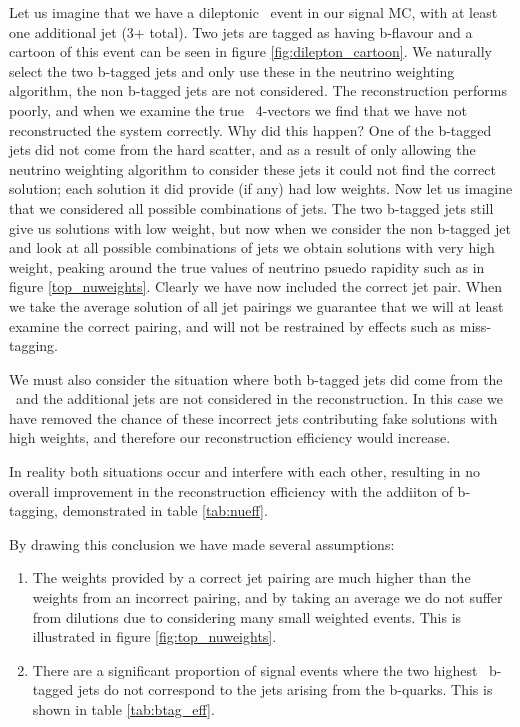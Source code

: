 Let us imagine that we have a dileptonic \ttbar\ event in our signal MC, with at least one additional jet (3+ total). Two jets are tagged as having b-flavour and a cartoon of this event can be seen in figure \ref{fig:dilepton_cartoon}. We naturally select the two b-tagged jets and only use these in the neutrino weighting algorithm, the non b-tagged jets are not considered. The reconstruction performs poorly, and when we examine the true \ttbar\ 4-vectors we find that we have not reconstructed the system correctly. Why did this happen? One of the b-tagged jets did not come from the hard scatter, and as a result of only allowing the neutrino weighting algorithm to consider these jets it could not find the correct solution; each solution it did provide (if any) had low weights. Now let us imagine that we considered all possible combinations of jets. The two b-tagged jets still give us solutions with low weight, but now when we consider the non b-tagged jet and look at all possible combinations of jets we obtain solutions with very high weight, peaking around the true values of neutrino psuedo rapidity such as in figure \ref{top_nuweights}. Clearly we have now included the correct jet pair. When we take the average solution of all jet pairings we guarantee that we will at least examine the correct pairing, and will not be restrained by effects such as miss-tagging.

We must also consider the situation where both b-tagged jets did come from the \ttbar\ and the additional jets are not considered in the reconstruction. In this case we have removed the chance of these incorrect jets contributing fake solutions with high weights, and therefore our reconstruction efficiency would increase.

In reality both situations occur and interfere with each other, resulting in no overall improvement in the reconstruction efficiency with the addiiton of b-tagging, demonstrated in table \ref{tab:nueff}.

By drawing this conclusion we have made several assumptions:

\begin{enumerate}
\item The weights provided by a correct jet pairing are much higher than the weights from an incorrect pairing, and by taking an average we do not suffer from dilutions due to considering many small weighted events. This is illustrated in figure \ref{fig:top_nuweights}.
\item There are a significant proportion of signal events where the two highest \pt\ b-tagged jets do not correspond to the jets arising from the b-quarks. This is shown in table \ref{tab:btag_eff}.
\end{enumerate}

